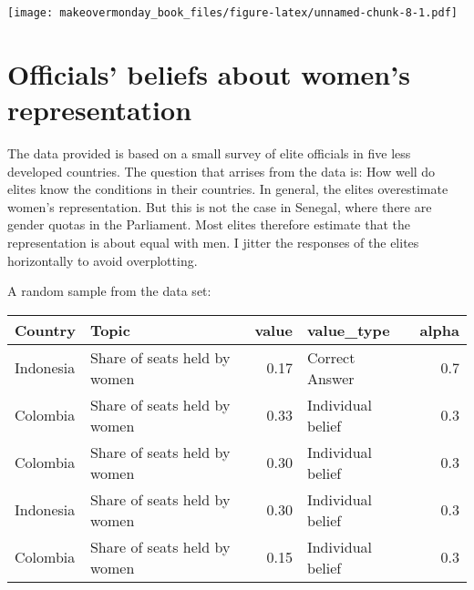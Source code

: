 \documentclass[]{book}
\theoremstyle{definition}
\theoremstyle{definition}
\theoremstyle{definition}
\theoremstyle{remark}
\begin{document}
\texttt{[image: makeovermonday\_book\_files/figure-latex/unnamed-chunk-8-1.pdf]}

\chapter{Officials' beliefs about women's
representation}\label{officials-beliefs-about-womens-representation}

The data provided is based on a small survey of elite officials in five
less developed countries. The question that arrises from the data is:
How well do elites know the conditions in their countries. In general,
the elites overestimate women's representation. But this is not the case
in Senegal, where there are gender quotas in the Parliament. Most elites
therefore estimate that the representation is about equal with men. I
jitter the responses of the elites horizontally to avoid overplotting.

A random sample from the data set:

\begin{tabular}{l|l|r|l|r}
\hline
Country & Topic & value & value\_type & alpha\\
\hline
Indonesia & Share of seats held by women & 0.17 & Correct Answer & 0.7\\
\hline
Colombia & Share of seats held by women & 0.33 & Individual belief & 0.3\\
\hline
Colombia & Share of seats held by women & 0.30 & Individual belief & 0.3\\
\hline
Indonesia & Share of seats held by women & 0.30 & Individual belief & 0.3\\
\hline
Colombia & Share of seats held by women & 0.15 & Individual belief & 0.3\\
\hline
\end{tabular}
\end{document}
